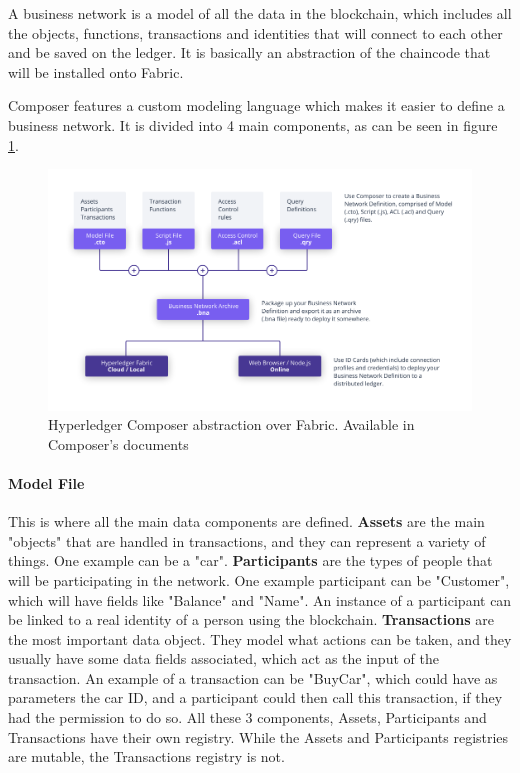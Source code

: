 A business network is a model of all the data in the blockchain, which includes all the objects, functions, transactions and identities that will connect to each other and be saved on the ledger. It is basically an abstraction of the chaincode that will be installed onto Fabric.

Composer features a custom modeling language which makes it easier to define a business network. It is divided into 4 main components, as can be seen in figure \ref{fig:composer_abstraction}.

\begin{figure}[h]
\centering
\includegraphics[scale=0.40]{media/Composer-Diagram.png}
\caption[Hyperledger Composer abstraction over Fabric]{Hyperledger Composer abstraction over Fabric. Available in Composer's documents \cite{ComposerIntro}}
\label{fig:composer_abstraction}
\end{figure}

\paragraph{Model File} This is where all the main data components are defined. \textbf{Assets} are the main "objects" that are handled in transactions, and they can represent a variety of things. One example can be a "car". \textbf{Participants} are the types of people that will be participating in the network. One example participant can be "Customer", which will have fields like "Balance" and "Name". An instance of a participant can be linked to a real identity of a person using the blockchain. \textbf{Transactions} are the most important data object. They model what actions can be taken, and they usually have some data fields associated, which act as the input of the transaction. An example of a transaction can be "BuyCar", which could have as parameters the car ID, and a participant could then call this transaction, if they had the permission to do so. All these 3 components, Assets, Participants and Transactions have their own registry. While the Assets and Participants registries are mutable, the Transactions registry is not.

